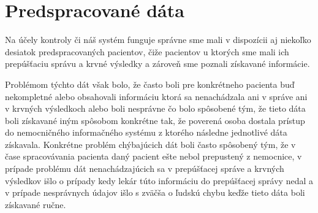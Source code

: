 \section{Predspracované dáta}
\label{predSprac}
Na účely kontroly či náš systém funguje správne sme mali v dispozícii aj niekoľko desiatok predspracovaných pacientov, čiže pacientov u ktorých sme mali ich prepúšťaciu správu a krvné výsledky a zároveň sme poznali získavané informácie. 

Problémom týchto dát však bolo, že často boli pre konkrétneho pacienta buď nekompletné alebo obsahovali informáciu ktorá sa nenachádzala ani v správe ani v krvných výsledkoch alebo boli nesprávne čo bolo spôsobené tým, že tieto dáta boli získavané iným spôsobom konkrétne tak, že poverená osoba dostala prístup do nemocničného informačného systému z ktorého následne jednotlivé dáta získavala. Konkrétne problém chýbajúcich dát boli často spôsobený tým, že v čase spracovávania pacienta daný pacient ešte nebol prepustený z nemocnice, v prípade problému dát nenachádzajúcich sa v prepúšťacej správe a krvných výsledkov išlo o prípady kedy lekár túto informáciu do prepúšťacej správy nedal a v prípade nesprávnych údajov išlo s zväčša o ľudskú chybu keďže tieto dáta boli získavané ručne.

